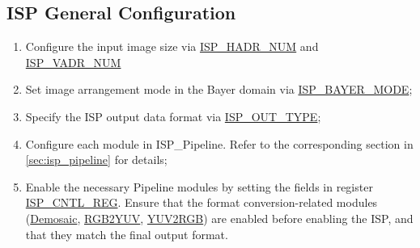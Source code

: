 \documentclass[main\_\_EN.tex]{subfiles}
\begin{document}
\subsection{ISP General Configuration}
\label{sec:isp_common_proc}
\begin{enumerate}
    \item Configure the input image size via \hyperref[fielddesc:ISPHADRNUM]{ISP\_HADR\_NUM} and \hyperref[fielddesc:ISPVADRNUM]{ISP\_VADR\_NUM}

    \item Set image arrangement mode in the Bayer domain via \hyperref[fielddesc:ISPBAYERMODE]{ISP\_BAYER\_MODE};

    \item Specify the ISP output data format via \hyperref[fielddesc:ISPOUTTYPE]{ISP\_OUT\_TYPE};

   \item Configure each module in ISP\_Pipeline. Refer to the corresponding section in \ref{sec:isp_pipeline} for details;

    \item Enable the necessary Pipeline modules by setting the fields in register \hyperref[regdesc:ISPCNTLREG]{ISP\_CNTL\_REG}. Ensure that the format conversion-related modules (\hyperref[sec:isp_demosaic]{Demosaic}, \hyperref[sec:isp_rgb2yuv]{RGB2YUV}, \hyperref[sec:isp_yuv2rgb]{YUV2RGB}) are enabled before enabling the ISP, and that they match the final output format.
\end{enumerate}
\end{document}
